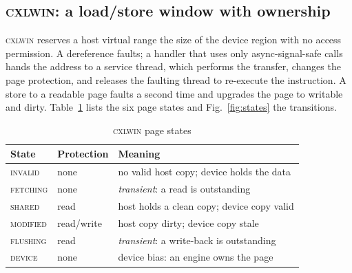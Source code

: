 \documentclass[lettersize,journal]{IEEEtran}
\newcommand{\cxlwin}{\textsc{cxlwin}}
\begin{document}
\subsection{\cxlwin{}: a load/store window with ownership}
\label{sec:cxlwin}
\cxlwin{} reserves a host virtual range the size of the device region with no access permission. A dereference faults; a handler that uses only async-signal-safe calls hands the address to a service thread, which performs the transfer, changes the page protection, and releases the faulting thread to re-execute the instruction. A store to a readable page faults a second time and upgrades the page to writable and dirty. Table~\ref{tab:states} lists the six page states and Fig.~\ref{fig:states} the transitions.

\begin{table}[t]\caption{\cxlwin{} page states}\label{tab:states}\centering\footnotesize
\begin{tabular}{@{}llp{4.3cm}@{}}\toprule
State & Protection & Meaning \\ \midrule
\textsc{invalid} & none & no valid host copy; device holds the data \\
\textsc{fetching} & none & \emph{transient}: a read is outstanding \\
\textsc{shared} & read & host holds a clean copy; device copy valid \\
\textsc{modified} & read/write & host copy dirty; device copy stale \\
\textsc{flushing} & read & \emph{transient}: a write-back is outstanding \\
\textsc{device} & none & device bias: an engine owns the page \\ \bottomrule
\end{tabular}\end{table}
\end{document}
